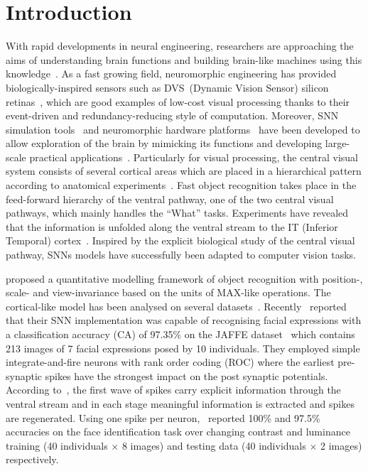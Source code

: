\documentclass{frontiersENG} %
\begin{document}
\section{Introduction}
\label{sec:intro}
With rapid developments in neural engineering, researchers are approaching the aims of understanding brain functions and building brain-like machines using this knowledge~\citep{furber2007neural}.
As a fast growing field, neuromorphic engineering has provided biologically-inspired sensors such as DVS~(Dynamic Vision Sensor) silicon retinas~\citep{serrano2013128, delbruck2008frame, yang2015dynamic, posch2014retinomorphic}, which are good examples of low-cost visual processing thanks to their event-driven and redundancy-reducing style of computation.
Moreover, SNN simulation tools~\citep{davison2008pynn, gewaltig2007nest, goodman2008brian} and neuromorphic hardware platforms~\citep{furber2014spinnaker,  schemmel2010wafer, merolla2014million} have been developed to allow exploration of the brain by mimicking its functions and developing large-scale practical applications~\citep{eliasmith2012large}.
Particularly for visual processing, the central visual system consists of several cortical areas which are placed in a hierarchical pattern according to anatomical experiments~\citep{felleman1991distributed}.
Fast object recognition takes place in  the feed-forward hierarchy of the ventral pathway, one of the two central visual pathways, which mainly handles the ``What'' tasks.
Experiments have revealed that the information is unfolded along the ventral stream to the  IT (Inferior Temporal) cortex~\citep{dicarlo2012does}.
Inspired by the  explicit  biological study of the central visual pathway, SNNs models have successfully been adapted to computer vision tasks.  

\cite{riesenhuber1999hierarchical} proposed a quantitative modelling framework of object recognition with position-, scale- and view-invariance based on the units of MAX-like operations.
The cortical-like model has been analysed on several datasets~\citep{serre2007robust}.
Recently~\cite{fu2012spiking} reported that their SNN implementation was capable of recognising facial expressions with a classification accuracy (CA) of 97.35\% on the JAFFE dataset~\citep{lyons1998coding} which contains 213 images of 7 facial expressions posed by 10 individuals.
They employed simple integrate-and-fire neurons with rank order coding (ROC) where  the earliest pre-synaptic spikes have the strongest impact on the post synaptic potentials.
According to~\cite{vanrullen2002surfing}, the first wave of spikes  carry explicit information through the ventral stream and in each stage meaningful information is extracted and spikes are regenerated. 
Using one spike per neuron,~\cite{delorme2001face} reported 100\% and 97.5\% accuracies on the face identification task over changing  contrast and luminance training (40 individuals $\times$ 8 images) and testing data (40 individuals $\times$ 2 images) respectively.
\end{document}
